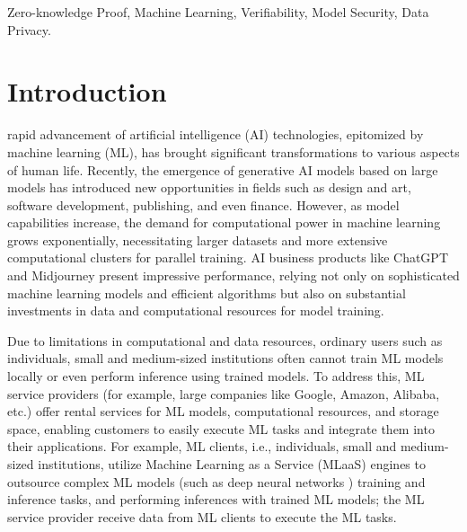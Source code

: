 \documentclass[journal]{IEEEtran}
\begin{document}
\begin{IEEEkeywords}
Zero-knowledge Proof, Machine Learning, Verifiability, Model Security, Data Privacy.
\end{IEEEkeywords}

\linenumbers

\section{Introduction}\label{s:intro}
 rapid advancement of artificial intelligence (AI) technologies, epitomized by machine learning (ML), has brought significant transformations to various aspects of human life. Recently, the emergence of generative AI models based on large models has introduced new opportunities in fields such as design and art, software development, publishing, and even finance. However, as model capabilities increase, the demand for computational power in machine learning grows exponentially, necessitating larger datasets and more extensive computational clusters for parallel training. AI business products like ChatGPT \cite{wu2023brief} and Midjourney \cite{borji2022generated} present impressive performance, relying not only on sophisticated machine learning models and efficient algorithms but also on substantial investments in data and computational resources for model training.

Due to limitations in computational and data resources, ordinary users such as individuals, small and medium-sized institutions often cannot train ML models locally or even perform inference using trained models. To address this, ML service providers (for example, large companies like Google, Amazon, Alibaba, etc.) offer rental services for ML models, computational resources, and storage space, enabling customers to easily execute ML tasks and integrate them into their applications. For example, ML clients, i.e., individuals, small and medium-sized institutions, utilize Machine Learning as a Service (MLaaS) \cite{ribeiro2015mlaas} engines to outsource complex ML models (such as  deep neural networks ) training and inference tasks, and performing inferences with trained ML models; the ML service provider receive data from ML clients to execute the ML tasks. 
\end{document}
